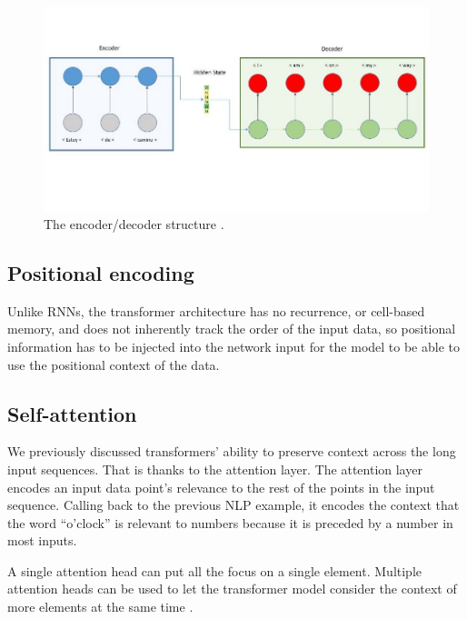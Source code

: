 \begin{figure}[ht!]
    \centering
    \includegraphics[scale=0.5]{imgs/encoder_decoder.jpeg}
    \caption{The encoder/decoder structure \cite{nechu_what_2020}.
    \label{fig:encoder_decoder}}
\end{figure}

\subsection{Positional encoding}
Unlike RNNs, the transformer architecture has no recurrence, or cell-based memory, and does not inherently track the order of the input data, so positional information has to be injected into the network input for the model to be able to use the positional context of the data.\cite{vaswani_attention_2017}

\subsection{Self-attention} We previously discussed transformers' ability to preserve context across the long input sequences. That is thanks to the attention layer. The attention layer encodes an input data point's relevance to the rest of the points in the input sequence. Calling back to the previous NLP example, it encodes the context that the word \enquote{o'clock} is relevant to numbers because it is preceded by a number in most inputs.
 
A single attention head can put all the focus on a single element. Multiple attention heads can be used to let the transformer model consider the context of more elements at the same time \cite{rohrer_transformers_2021}.

